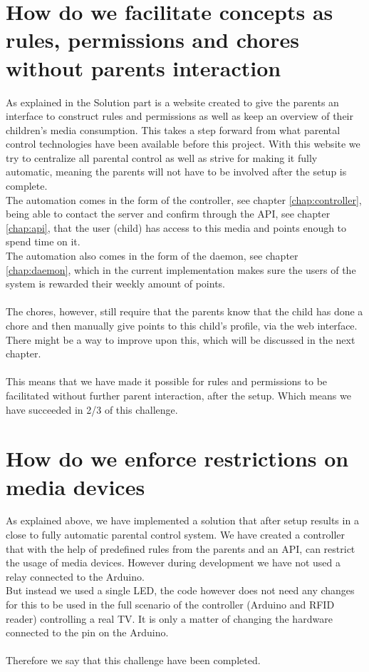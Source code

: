 \section*{How do we facilitate concepts as rules, permissions and chores without parents interaction}
As explained in the Solution part is a website created to give the parents an interface to construct rules and permissions as well as keep an overview of their children's media consumption. This takes a step forward from what parental control technologies have been available before this project. With this website we try to centralize all parental control as well as strive for making it fully automatic, meaning the parents will not have to be involved after the setup is complete.\\
The automation comes in the form of the controller, see chapter \vref{chap:controller}, being able to contact the server and confirm through the API, see chapter \vref{chap:api}, that the user (child) has access to this media and points enough to spend time on it.\\
The automation also comes in the form of the daemon, see chapter \vref{chap:daemon}, which in the current implementation makes sure the users of the system is rewarded their weekly amount of points.\\
\\
The chores, however, still require that the parents know that the child has done a chore and then manually give points to this child's profile, via the web interface. There might be a way to improve upon this, which will be discussed in the next chapter.\\
\\
This means that we have made it possible for rules and permissions to be facilitated without further parent interaction, after the setup. Which means we have succeeded in 2/3 of this challenge.

\section*{How do we enforce restrictions on media devices}
As explained above, we have implemented a solution that after setup results in a close to fully automatic parental control system. We have created a controller that with the help of predefined rules from the parents and an API, can restrict the usage of media devices. However during development we have not used a relay connected to the Arduino. \\
But instead we used a single LED, the code however does not need any changes for this to be used in the full scenario of the controller (Arduino and RFID reader) controlling a real TV. It is only a matter of changing the hardware connected to the pin on the Arduino.\\
\\
Therefore we say that this challenge have been completed.

